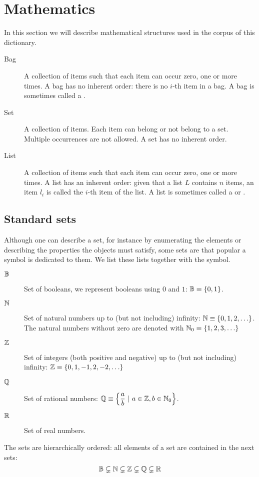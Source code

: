 \clearpage{}
\section*{Mathematics}
In this section we will describe mathematical structures used in the corpus of this dictionary.
\begin{description}
 \item [Bag] A collection of items such that each item can occur zero, one or more times. A bag has no inherent order: there is no $i$-th item in a bag. A bag is sometimes called a .
 \item [Set] A collection of items. Each item can belong or not belong to a set. Multiple occurrences are not allowed. A set has no inherent order.
 \item [List] A collection of items such that each item can occur zero, one or more times. A list has an inherent order: given that a list $L$ contains $n$ items, an item $l_i$ is called the $i$-th item of the list. A list is sometimes called a  or .
\end{description}
\subsection*{Standard sets}
Although one can describe a set, for instance by enumerating the elements or describing the properties the objects must satisfy, some sets are that popular a symbol is dedicated to them. We list these lists together with the symbol.
\begin{description}
 \item [$\mathbb{B}$] Set of booleans, we represent booleans using $0$ and $1$: $\mathbb{B}\equiv\left\{ 0,1 \right\}$.
 \item [$\mathbb{N}$] Set of natural numbers up to (but not including) infinity: $\mathbb{N}\equiv\left\{ 0,1,2,\ldots \right\}$. The natural numbers without zero are denoted with $\mathbb{N}_0\equiv\left\{ 1,2,3,\ldots \right\}$
 \item [$\mathbb{Z}$] Set of integers (both positive and negative) up to (but not including) infinity: $\mathbb{Z}\equiv\left\{ 0,1,-1,2,-2,\ldots \right\}$
 \item [$\mathbb{Q}$] Set of rational numbers: $\mathbb{Q}\equiv\left\{ \dfrac{a}{b}\ |\ a\in\mathbb{Z},b\in\mathbb{N}_0 \right\}$.
 \item [$\mathbb{R}$] Set of real numbers.
\end{description}
The sets are hierarchically ordered: all elements of a set are contained in the next sets:
\[
\mathbb{B}\subsetneq\mathbb{N}\subsetneq\mathbb{Z}\subsetneq\mathbb{Q}\subsetneq\mathbb{R}
\]
